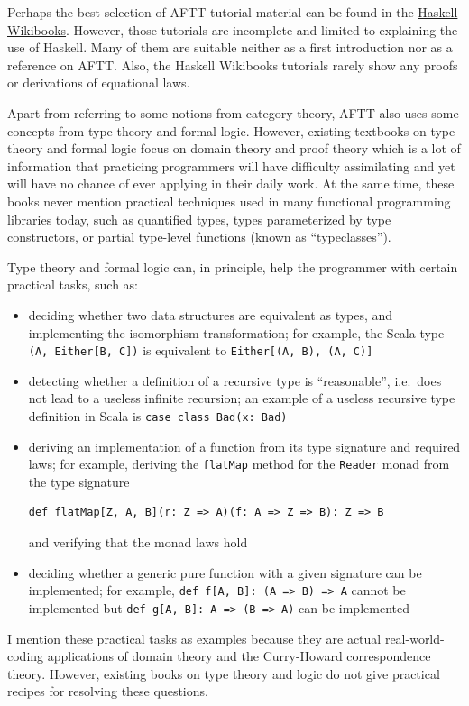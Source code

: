 Perhaps the best selection of AFTT tutorial material can be found
in the \href{https://en.wikibooks.org/wiki/Haskell}{Haskell Wikibooks}.
However, those tutorials are incomplete and limited to explaining
the use of Haskell. Many of them are suitable neither as a first introduction
nor as a reference on AFTT. Also, the Haskell Wikibooks tutorials
rarely show any proofs or derivations of equational laws.

Apart from referring to some notions from category theory, AFTT also
uses some concepts from type theory and formal logic. However, existing
textbooks on type theory and formal logic focus on domain theory and
proof theory \textendash{} which is a lot of information that practicing
programmers will have difficulty assimilating and yet will have no
chance of ever applying in their daily work. At the same time, these
books never mention practical techniques used in many functional programming
libraries today, such as quantified types, types parameterized by
type constructors, or partial type-level functions (known as ``typeclasses'').

Type theory and formal logic can, in principle, help the programmer
with certain practical tasks, such as:
\begin{itemize}
\item deciding whether two data structures are equivalent as types, and
implementing the isomorphism transformation; for example, the Scala
type \lstinline!(A, Either[B, C])! is equivalent to \lstinline!Either[(A, B), (A, C)]! 
\item detecting whether a definition of a recursive type is ``reasonable'',
i.e.~does not lead to a useless infinite recursion; an example of
a useless recursive type definition in Scala is \lstinline!case class Bad(x: Bad)! 
\item deriving an implementation of a function from its type signature and
required laws; for example, deriving the \lstinline!flatMap! method
for the \lstinline!Reader! monad from the type signature 
\begin{lstlisting}
def flatMap[Z, A, B](r: Z => A)(f: A => Z => B): Z => B
\end{lstlisting}
 and verifying that the monad laws hold
\item deciding whether a generic pure function with a given signature can
be implemented; for example, \lstinline!def f[A, B]: (A => B) => A!
cannot be implemented but \lstinline!def g[A, B]: A => (B => A)!
can be implemented 
\end{itemize}
I mention these practical tasks as examples because they are actual
real-world-coding applications of domain theory and the Curry-Howard
correspondence theory. However, existing books on type theory and
logic do not give practical recipes for resolving these questions.

